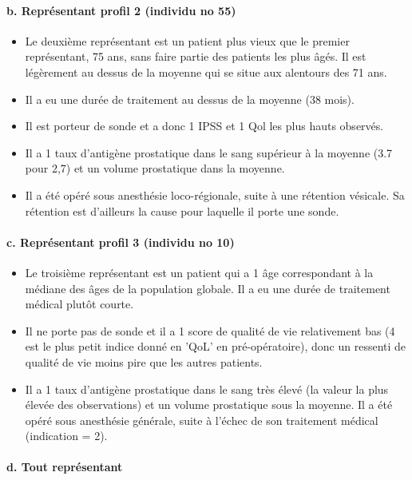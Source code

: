 \documentclass[11pt]{article}
\providecommand{\tightlist}{%
      \setlength{\itemsep}{0pt}\setlength{\parskip}{0pt}}
\begin{document}
    \paragraph{b. Représentant profil 2 (individu no
55)}\label{b.-repruxe9sentant-profil-2-individu-no-55}

\begin{itemize}
\tightlist
\item
Le deuxième représentant est un patient plus vieux que le premier
représentant, 75 ans, sans faire partie des patients les plus âgés. Il
est légèrement au dessus de la moyenne qui se situe aux alentours des 71
ans.
\item
Il a eu une durée de traitement au dessus de la moyenne (38 mois).
\item
Il est porteur de sonde et a donc 1 IPSS et 1 Qol les plus hauts
observés.
\item
Il a 1 taux d'antigène prostatique dans le sang supérieur à la moyenne
(3.7 pour 2,7) et un volume prostatique dans la moyenne.
\item
Il a été opéré sous anesthésie loco-régionale, suite à une rétention
vésicale. Sa rétention est d'ailleurs la cause pour laquelle il porte
une sonde.
\end{itemize}

    \paragraph{c. Représentant profil 3 (individu no
10)}\label{c.-repruxe9sentant-profil-3-individu-no-10}

\begin{itemize}
\tightlist
\item
Le troisième représentant est un patient qui a 1 âge correspondant à la
médiane des âges de la population globale. Il a eu une durée de
traitement médical plutôt courte.
\item
Il ne porte pas de sonde et il a 1 score de qualité de vie relativement
bas (4 est le plus petit indice donné en 'QoL' en pré-opératoire), donc
un ressenti de qualité de vie moins pire que les autres patients.
\item
Il a 1 taux d'antigène prostatique dans le sang très élevé (la valeur la
plus élevée des observations) et un volume prostatique sous la moyenne.
Il a été opéré sous anesthésie générale, suite à l'échec de son
traitement médical (indication = 2).
\end{itemize}

    \paragraph{d. Tout représentant}\label{d.-tout-repruxe9sentant}
\end{document}
